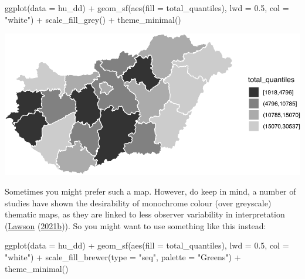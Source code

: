 \documentclass[
]{book}
\newenvironment{Shaded}{\begin{snugshade}}{\end{snugshade}}
\newcommand{\AttributeTok}[1]{\textcolor[rgb]{0.77,0.63,0.00}{#1}}
\newcommand{\FloatTok}[1]{\textcolor[rgb]{0.00,0.00,0.81}{#1}}
\newcommand{\FunctionTok}[1]{\textcolor[rgb]{0.00,0.00,0.00}{#1}}
\newcommand{\NormalTok}[1]{#1}
\newcommand{\SpecialCharTok}[1]{\textcolor[rgb]{0.00,0.00,0.00}{#1}}
\newcommand{\StringTok}[1]{\textcolor[rgb]{0.31,0.60,0.02}{#1}}
\begin{document}
\begin{Shaded}
\begin{Highlighting}[]
\FunctionTok{ggplot}\NormalTok{(}\AttributeTok{data =}\NormalTok{ hu\_dd) }\SpecialCharTok{+} 
  \FunctionTok{geom\_sf}\NormalTok{(}\FunctionTok{aes}\NormalTok{(}\AttributeTok{fill =}\NormalTok{ total\_quantiles), }\AttributeTok{lwd =} \FloatTok{0.5}\NormalTok{, }\AttributeTok{col =} \StringTok{"white"}\NormalTok{) }\SpecialCharTok{+} 
  \FunctionTok{scale\_fill\_grey}\NormalTok{() }\SpecialCharTok{+} 
  \FunctionTok{theme\_minimal}\NormalTok{()}
\end{Highlighting}
\end{Shaded}

\includegraphics{crime_mapping_files/figure-latex/greyscaletestsmap-1.pdf}

Sometimes you might prefer such a map. However, do keep in mind, a number of studies have shown the desirability of monochrome colour (over greyscale) thematic maps, as they are linked to less observer variability in interpretation (\protect\hyperlink{ref-Lawson_2006}{Lawson} (\protect\hyperlink{ref-Lawson_2006}{2021b})). So you might want to use something like this instead:

\begin{Shaded}
\begin{Highlighting}[]
\FunctionTok{ggplot}\NormalTok{(}\AttributeTok{data =}\NormalTok{ hu\_dd) }\SpecialCharTok{+} 
  \FunctionTok{geom\_sf}\NormalTok{(}\FunctionTok{aes}\NormalTok{(}\AttributeTok{fill =}\NormalTok{ total\_quantiles), }\AttributeTok{lwd =} \FloatTok{0.5}\NormalTok{, }\AttributeTok{col =} \StringTok{"white"}\NormalTok{) }\SpecialCharTok{+} 
  \FunctionTok{scale\_fill\_brewer}\NormalTok{(}\AttributeTok{type =} \StringTok{"seq"}\NormalTok{, }\AttributeTok{palette =} \StringTok{"Greens"}\NormalTok{) }\SpecialCharTok{+} 
  \FunctionTok{theme\_minimal}\NormalTok{()}
\end{Highlighting}
\end{Shaded}
\end{document}
